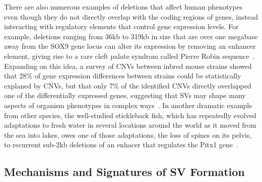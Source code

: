 There are also numerous examples of deletions that affect human phenotypes even though they do not directly overlap with the coding regions of genes, instead interacting with regulatory elements that control gene expression levels. For example, deletions ranging from 36kb to 319kb in size that are over one megabase away from the SOX9 gene locus can alter its expression by removing an enhancer element, giving rise to a rare cleft palate syndrom called Pierre Robin sequence~\cite{Benko:2009dq}. Expanding on this idea, a survey of CNVs between inbred mouse strains showed that 28\% of gene expression differences between strains could be statistically explaned by CNVs, but that only 7\% of the identified CNVs directly overlapped one of the differentially expressed genes, suggesting that SVs may shape many aspects of organism phenotypes in complex ways~\cite{Cahan:2009ef}. In another dramatic example from other species, the well-studied stickleback fish, which has repeatedly evolved adaptations to fresh water in several locations around the world as it moved from the sea into lakes, owes one of those adaptations, the loss of spines on its pelvis, to recurrent sub-2kb deletions of an enhacer that regulates the Pitx1 gene~\cite{Chan:2010hz}.


\subsection{Mechanisms and Signatures of SV Formation}

